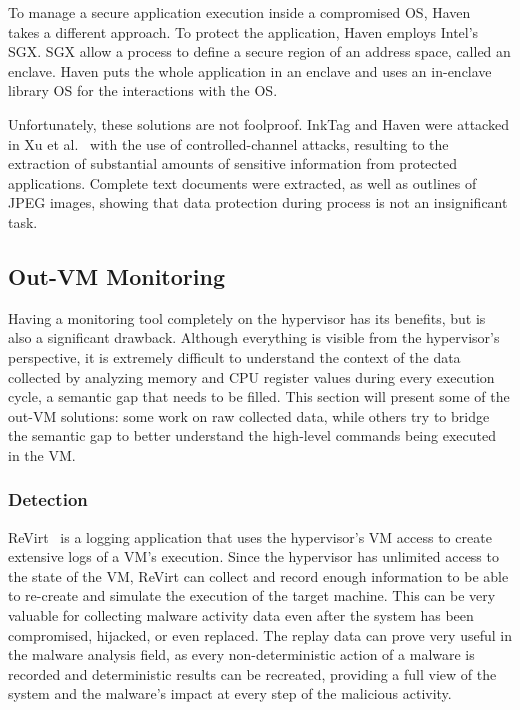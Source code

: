 \par To manage a secure application execution inside a compromised \ac{OS}, Haven~\cite{baumann2015shielding} takes a different approach. To protect the application, Haven employs Intel's \ac{SGX}. \ac{SGX} allow a process to define a secure region of an address space, called an enclave. Haven puts the whole application in an enclave and uses an in-enclave library \ac{OS} for the interactions with the \ac{OS}.

\par Unfortunately, these solutions are not foolproof. InkTag and Haven were attacked in Xu et al.~\cite{xu2015controlled} with the use of controlled-channel attacks, resulting to the extraction of substantial amounts of sensitive information from protected applications. Complete text documents were extracted, as well as outlines of JPEG images, showing that data protection during process is not an insignificant task. 


\subsection{Out-\ac{VM} Monitoring}\label{sub:outvm}
Having a monitoring tool completely on the hypervisor has its benefits, but is also a significant drawback. Although everything is visible from the hypervisor's perspective, it is extremely difficult to understand the context of the data collected by analyzing memory and \ac{CPU} register values during every execution cycle, a semantic gap that needs to be filled. This section will present some of the out-\ac{VM} solutions: some work on raw collected data, while others try to bridge the semantic gap to better understand the high-level commands being executed in the \ac{VM}.

\subsubsection{Detection}

\par ReVirt~\cite{dunlap2002revirt} is a logging application that uses the hypervisor’s \ac{VM} access to create extensive logs of a \ac{VM}’s execution. Since the hypervisor has unlimited access to the state of the \ac{VM}, ReVirt can collect and record enough information to be able to re-create and simulate the execution of the target machine. This can be very valuable for collecting malware activity data even after the system has been compromised, hijacked, or even replaced. The replay data can prove very useful in the malware analysis field, as every non-deterministic action of a malware is recorded and deterministic results can be recreated, providing a full view of the system and the malware's impact at every step of the malicious activity.

